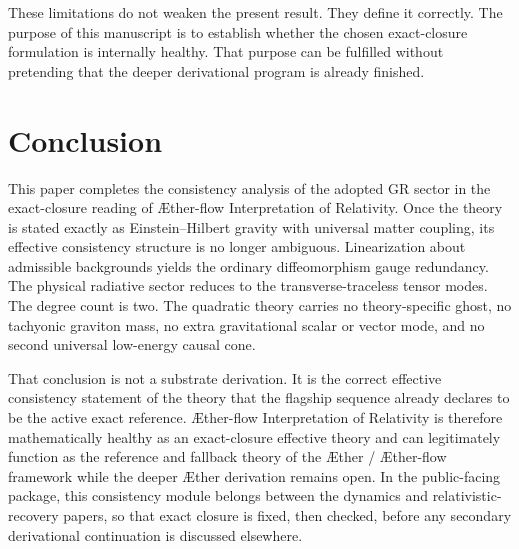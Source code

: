 \documentclass[11pt]{article}
\newcommand{\Aether}{\AE{}ther}
\newcommand{\Aflow}{\AE{}ther-flow}
\newcommand{\TheoryName}{\Aflow{} Interpretation of Relativity}
\newcommand{\TheoryProgram}{\Aether{} / \Aflow{} framework}
\begin{document}
These limitations do not weaken the present result. They define it correctly. The purpose of this manuscript is to establish whether the chosen exact-closure formulation is internally healthy. That purpose can be fulfilled without pretending that the deeper derivational program is already finished.

\section{Conclusion}

This paper completes the consistency analysis of the adopted GR sector in the exact-closure reading of \TheoryName{}. Once the theory is stated exactly as Einstein--Hilbert gravity with universal matter coupling, its effective consistency structure is no longer ambiguous. Linearization about admissible backgrounds yields the ordinary diffeomorphism gauge redundancy. The physical radiative sector reduces to the transverse-traceless tensor modes. The degree count is two. The quadratic theory carries no theory-specific ghost, no tachyonic graviton mass, no extra gravitational scalar or vector mode, and no second universal low-energy causal cone.

That conclusion is not a substrate derivation. It is the correct effective consistency statement of the theory that the flagship sequence already declares to be the active exact reference. \TheoryName{} is therefore mathematically healthy as an exact-closure effective theory and can legitimately function as the reference and fallback theory of the \TheoryProgram{} while the deeper \Aether{} derivation remains open. In the public-facing package, this consistency module belongs between the dynamics and relativistic-recovery papers, so that exact closure is fixed, then checked, before any secondary derivational continuation is discussed elsewhere.


\end{document}
